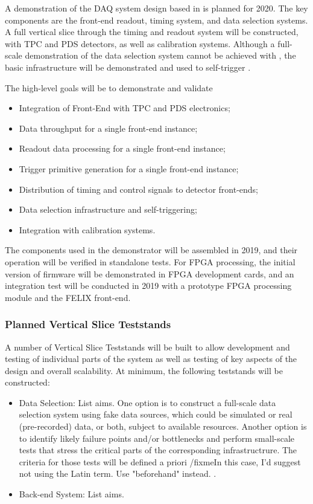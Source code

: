 A demonstration of the DAQ system design based in  is
planned for 2020. The key components are the front-end readout, timing
system, and data selection systems. A full vertical slice through the
timing and readout system will be constructed, with
TPC and PDS detectors, as well as calibration systems. Although a full-scale
demonstration of the data selection system cannot be achieved with
, the basic infrastructure will be demonstrated and
used to self-trigger .

The high-level goals will be to demonstrate and validate
\begin{itemize}
\item Integration of Front-End with TPC and PDS electronics;
\item Data throughput for a single front-end instance;
\item Readout data processing for a single front-end instance;
\item Trigger primitive generation for a single front-end instance;
\item Distribution of timing and control signals to detector front-ends;
\item Data selection infrastructure and self-triggering;
\item Integration with calibration systems.
\end{itemize}

The components used in the 
demonstrator will be assembled in 2019, and their operation will
be verified in standalone tests. For FPGA processing, the
initial version of firmware will be demonstrated in FPGA development
cards, and an integration test will be conducted in 2019 with a
prototype FPGA processing module and the FELIX front-end.


\subsubsection{Planned Vertical Slice Teststands}
\label{sec:sp-daq:validation-demonstrators}

A number of Vertical Slice Teststands will be built to allow
development and testing of individual parts of the  system
as well as testing of key aspects of the design and overall scalability. At minimum, the following teststands
will be constructed:
\begin{itemize}
\item Data Selection: List aims. One option is to construct a
  full-scale data selection system using fake data 
sources, which could be simulated or real (pre-recorded)
 data,
or both, subject to available resources. Another option is to identify
likely failure points and/or bottlenecks and perform
small-scale tests that stress the critical parts of the corresponding
infrastructrure. The criteria for those tests will be defined a priori /fixme{In this case, I'd suggest not using the Latin term. Use "beforehand" instead.} .
\item Back-end System: List aims.
\end{itemize}

